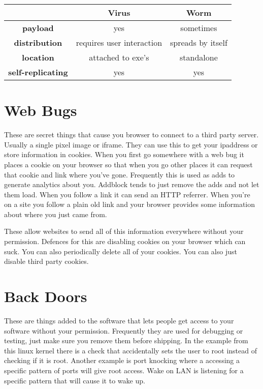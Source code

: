 \documentclass{article}
\begin{document}
\begin{tabular}{|c|c|c|}
	\hline
	& \textbf{Virus} & \textbf{Worm}\\
	\hline
	\textbf{payload} & yes & sometimes\\
	\hline
	\textbf{distribution} & requires user interaction & spreads by itself\\
	\hline
	\textbf{location} & attached to exe's & standalone\\
	\hline
	\textbf{self-replicating} & yes & yes\\
	\hline
\end{tabular}


\section{Web Bugs} %
\label{sec:web_bugs}
These are secret things that cause you browser to connect to a third party server. Usually a single pixel image or iframe. They can use this to get your ipaddress or store information in cookies. When you first go somewhere with a web bug it places a cookie on your browser so that when you go other places it can request that cookie and link where you've gone. Frequently this is used as adds to generate analytics about you. Addblock tends to just remove the adds and not let them load. When you follow a link it can send an HTTP referrer. When you're on a site you follow a plain old link and your browser provides some information about where you just came from. 

These allow websites to send all of this information everywhere without your permission. Defences for this are disabling cookies on your browser which can suck. You can also periodically delete all of your cookies. You can also just disable third party cookies. 



\section{Back Doors} %
\label{sec:back_doors}
These are things added to the software that lets people get access to your software without your permission. Frequently they are used for debugging or testing, just make sure you remove them before shipping. In the example from this linux kernel there is a check that accidentally sets the user to root instead of checking if it is root. Another example is port knocking where a accessing a specific pattern of ports will give root access. Wake on LAN is listening for a specific pattern that will cause it to wake up.
\end{document}
